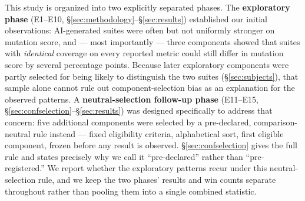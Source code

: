 \documentclass[10pt,conference]{IEEEtran}
\begin{document}
This study is organized into two explicitly separated phases. The \textbf{exploratory phase} (E1--E10, \S\ref{sec:methodology}--\S\ref{sec:results}) established our initial observations: AI-generated suites were often but not uniformly stronger on mutation score, and — most importantly — three components showed that suites with \emph{identical} coverage on every reported metric could still differ in mutation score by several percentage points. Because later exploratory components were partly selected for being likely to distinguish the two suites (\S\ref{sec:subjects}), that sample alone cannot rule out component-selection bias as an explanation for the observed patterns. A \textbf{neutral-selection follow-up phase} (E11--E15, \S\ref{sec:confselection}--\S\ref{sec:results}) was designed specifically to address that concern: five additional components were selected by a pre-declared, comparison-neutral rule instead — fixed eligibility criteria, alphabetical sort, first eligible component, frozen before any result is observed. \S\ref{sec:confselection} gives the full rule and states precisely why we call it ``pre-declared'' rather than ``pre-registered.'' We report whether the exploratory patterns recur under this neutral-selection rule, and we keep the two phases' results and win counts separate throughout rather than pooling them into a single combined statistic.
\end{document}
